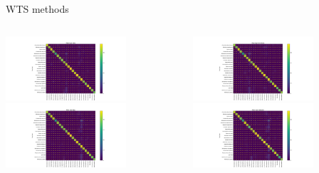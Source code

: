 
\begin{frame}{WTS methods}
    \begin{columns}
        \begin{column}{0.6\textwidth}
            \includegraphics[height=0.7\textheight,width=0.7\textwidth,keepaspectratio]{images/conf_mat_naive.png}
            \includegraphics[height=0.7\textheight,width=0.7\textwidth,keepaspectratio]{images/conf_mat_fgbg.png}
        \end{column}
        \begin{column}{0.6\textwidth}
            \includegraphics[height=0.7\textheight,width=0.7\textwidth,keepaspectratio]{images/conf_mat_microfaune.png}
            \includegraphics[height=0.7\textheight,width=0.7\textwidth,keepaspectratio]{images/conf_mat_tweetynet.png}
        \end{column}
    \end{columns}
\end{frame}

